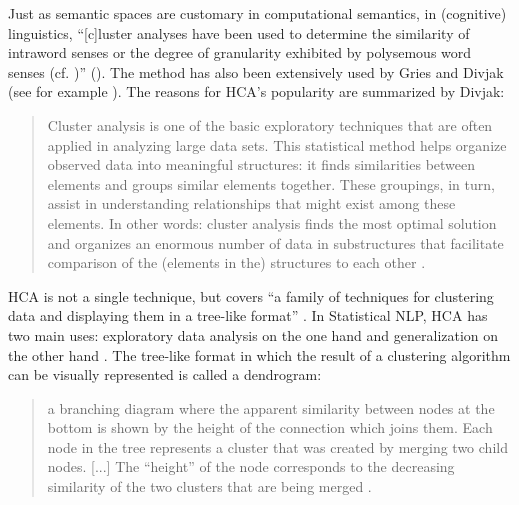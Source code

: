 Just as semantic spaces are customary in computational semantics, in (cognitive) linguistics, “[c]luster analyses have been used to determine the similarity of intraword senses or the degree of granularity exhibited by polysemous word senses (cf. \citealt{steinberg_empirical_1971,sandra_network_1995,putz_prepositional_1996})” (\citealt[81]{gries_corpus-based_2006}). The method has also been extensively used by Gries and Divjak (see for example \citealt{divjak_structuring_2010,glynn_cluster_2014,divjak_ways_2006, evans_behavioral_2009,gries_corpus-based_2006,evans_behavioral_2009,gries_behavioral_2010,deshors_case_2014}). The reasons for HCA’s popularity are summarized by Divjak:

\begin{quote}
Cluster analysis is one of the basic exploratory techniques that are often applied in analyzing large data sets. This statistical method helps organize observed data into meaningful structures: it finds similarities between elements and groups similar elements together. These groupings, in turn, assist in understanding relationships that might exist among these elements. In other words: cluster analysis finds the most optimal solution and organizes an enormous number of data in substructures that facilitate comparison of the (elements in the) structures to each other \citep[129--130]{divjak_structuring_2010}.
\end{quote}

HCA is not a single technique, but covers “a family of techniques for clustering data and displaying them in a tree-like format” \citep[138]{baayen_analyzing_2008}. In Statistical NLP, HCA has two main uses: exploratory data analysis on the one hand and generalization on the other hand \citep[497]{manning_foundations_1999}. The tree-like format in which the result of a clustering algorithm can be visually represented is called a dendrogram:

\begin{quote}
a branching diagram where the apparent similarity between nodes at the bottom is shown by the height of the connection which joins them. Each node in the tree represents a cluster that was created by merging two child nodes. [...] The “height” of the node corresponds to the decreasing similarity of the two clusters that are being merged \citep[495]{manning_foundations_1999}.
\end{quote}

